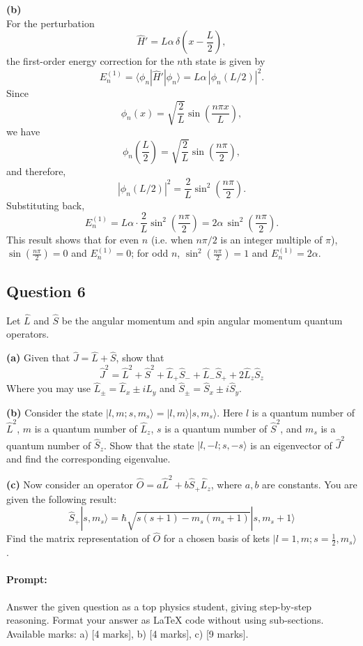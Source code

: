 \documentclass{article}
\begin{document}
\textbf{(b)} \\
For the perturbation 
\[
\hat{H}' = L \alpha \, \delta\left(x-\frac{L}{2}\right),
\]
the first-order energy correction for the \(n\)th state is given by
\[
E_n^{(1)} = \langle \phi_n | \hat{H}' | \phi_n \rangle = L \alpha \, |\phi_n(L/2)|^2.
\]
Since
\[
\phi_n(x) = \sqrt{\frac{2}{L}} \sin\left(\frac{n\pi x}{L}\right),
\]
we have
\[
\phi_n\left(\frac{L}{2}\right) = \sqrt{\frac{2}{L}} \sin\left(\frac{n\pi}{2}\right),
\]
and therefore,
\[
|\phi_n(L/2)|^2 = \frac{2}{L}\sin^2\left(\frac{n\pi}{2}\right).
\]
Substituting back,
\[
E_n^{(1)} = L \alpha \cdot \frac{2}{L}\sin^2\left(\frac{n\pi}{2}\right) = 2\alpha\, \sin^2\left(\frac{n\pi}{2}\right).
\]
This result shows that for even \(n\) (i.e. when \(n\pi/2\) is an integer multiple of \(\pi\)), \(\sin\left(\frac{n\pi}{2}\right)=0\) and \(E_n^{(1)}=0\); for odd \(n\), \(\sin^2\left(\frac{n\pi}{2}\right)=1\) and \(E_n^{(1)}=2\alpha\).


\subsection{Question 6}

Let \(\hat{L}\) and \(\hat{S}\) be the angular momentum and spin angular momentum quantum operators.

\textbf{(a)} Given that \(\hat{J} = \hat{L} + \hat{S}\), show that
\[
\hat{J}^2 = \hat{L}^2 + \hat{S}^2 + \hat{L}_+ \hat{S}_- + \hat{L}_- \hat{S}_+ + 2 \hat{L}_z \hat{S}_z
\]
Where you may use \(\hat{L}_\pm = \hat{L}_x \pm i \hat{L}_y\) and \(\hat{S}_\pm = \hat{S}_x \pm i \hat{S}_y\).

\textbf{(b)} Consider the state \(|l, m; s, m_s\rangle = |l, m\rangle |s, m_s\rangle\). Here \(l\) is a quantum number of \(\hat{L}^2\), \(m\) is a quantum number of \(\hat{L}_z\), \(s\) is a quantum number of \(\hat{S}^2\), and \(m_s\) is a quantum number of \(\hat{S}_z\). Show that the state \(|l, -l; s, -s\rangle\) is an eigenvector of \(\hat{J}^2\) and find the corresponding eigenvalue.

\textbf{(c)} Now consider an operator \(\hat{O} = a \hat{L}^2 + b \hat{S}_+ \hat{L}_z\), where \(a, b\) are constants. You are given the following result:
\[
\hat{S}_+ |s, m_s\rangle = \hbar \sqrt{s(s+1) - m_s(m_s + 1)} |s, m_s + 1\rangle
\]
Find the matrix representation of \(\hat{O}\) for a chosen basis of kets \(|l = 1, m; s = \frac{1}{2}, m_s\rangle\).

\paragraph{Prompt: \\} 
Answer the given question as a top physics student, giving step-by-step reasoning. Format your answer as LaTeX code without using sub-sections. Available marks: a) [4 marks], b) [4 marks], c) [9 marks].
\end{document}
